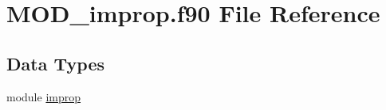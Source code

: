 \hypertarget{MOD__improp_8f90}{\section{M\-O\-D\-\_\-improp.\-f90 File Reference}
\label{MOD__improp_8f90}
}
\subsection*{Data Types}
\begin{DoxyCompactItemize}
\item 
module \hyperlink{classimprop}{improp}
\end{DoxyCompactItemize}
